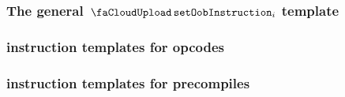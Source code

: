 \subsubsection{The general $\setOobInstruction{i}$ template             \lispDone{}}    \label{hub: misc: oob: general}                
\subsubsection{\oobMod{} instruction templates for \textbf{opcodes}     \lispDone{}}    \label{hub: misc: oob: opcodes}                
\subsubsection{\oobMod{} instruction templates for \textbf{precompiles} \lispDone{}}    \label{hub: misc: oob: precompiles}            
